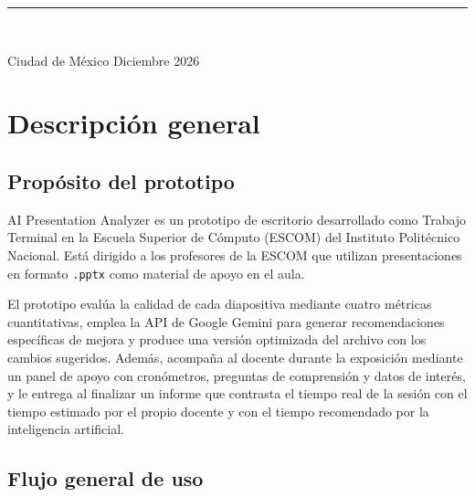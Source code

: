 \documentclass[11pt,letterpaper]{article}
\newcommand{\ruta}[1]{\texttt{#1}}
\begin{document}
\begin{titlepage}
  \vspace{1.6cm}
  {\color{azul}\rule{\linewidth}{1.2pt}}\\[0.3cm]
  \begin{center}
    {\sffamily Ciudad de México \quad\textperiodcentered\quad Diciembre 2026}
  \end{center}
\end{titlepage}

\tableofcontents
\clearpage
\listoffigures
\clearpage
\listoftables
\clearpage


\section{Descripción general}
\label{sec:overview}

\subsection{Propósito del prototipo}
\label{sec:proposito}

AI Presentation Analyzer es un prototipo de escritorio desarrollado como Trabajo Terminal en la Escuela Superior de Cómputo (ESCOM) del Instituto Politécnico Nacional. Está dirigido a los profesores de la ESCOM que utilizan presentaciones en formato \ruta{.pptx} como material de apoyo en el aula.

El prototipo evalúa la calidad de cada diapositiva mediante cuatro métricas cuantitativas, emplea la API de Google Gemini para generar recomendaciones específicas de mejora y produce una versión optimizada del archivo con los cambios sugeridos. Además, acompaña al docente durante la exposición mediante un panel de apoyo con cronómetros, preguntas de comprensión y datos de interés, y le entrega al finalizar un informe que contrasta el tiempo real de la sesión con el tiempo estimado por el propio docente y con el tiempo recomendado por la inteligencia artificial.

\subsection{Flujo general de uso}
\label{sec:flujo}
\end{document}
